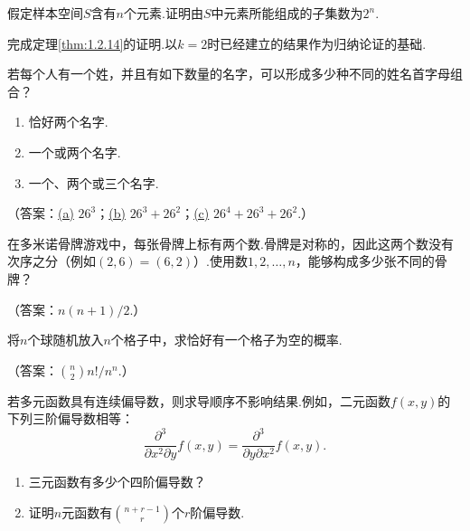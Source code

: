 \begin{exercise}\label{exercise:1.14}
假定样本空间$S$含有$n$个元素.证明由$S$中元素所能组成的子集数为$2^n$.
\end{exercise}

\begin{exercise}\label{exercise:1.15}
完成定理\ref{thm:1.2.14}的证明.以$k=2$时已经建立的结果作为归纳论证的基础.
\end{exercise}

\begin{exercise}\label{exercise:1.16}
若每个人有一个姓，并且有如下数量的名字，可以形成多少种不同的姓名首字母组合？
\begin{enumerate}
\item[(a)]\label{itm:exercise:1.16:a} 恰好两个名字.
\item[(b)]\label{itm:exercise:1.16:b} 一个或两个名字.
\item[(c)]\label{itm:exercise:1.16:c} 一个、两个或三个名字.
\end{enumerate}
（答案：\hyperref[itm:exercise:1.16:a]{(a)} $26^3$；\hyperref[itm:exercise:1.16:b]{(b)} $26^3+26^2$；\hyperref[itm:exercise:1.16:c]{(c)} $26^4+26^3+26^2$.）
\end{exercise}



\begin{exercise}\label{exercise:1.17}
在多米诺骨牌游戏中，每张骨牌上标有两个数.骨牌是对称的，因此这两个数没有次序之分（例如$(2,6)=(6,2)$）.使用数$1,2,\ldots,n$，能够构成多少张不同的骨牌？

（答案：$n(n+1)/2$.）
\end{exercise}

\begin{exercise}\label{exercise:1.18}
将$n$个球随机放入$n$个格子中，求恰好有一个格子为空的概率.

（答案：$\binom n2 n!/n^n$.）
\end{exercise}

\begin{exercise}\label{exercise:1.19}
若多元函数具有连续偏导数，则求导顺序不影响结果.例如，二元函数$f(x,y)$的下列三阶偏导数相等：
$$
\frac{\partial^3}{\partial x^2\partial y}f(x,y)
=\frac{\partial^3}{\partial y\partial x^2}f(x,y).
$$
\begin{enumerate}
\item[(a)] 三元函数有多少个四阶偏导数？
\item[(b)] 证明$n$元函数有$\binom{n+r-1}{r}$个$r$阶偏导数.
\end{enumerate}
\end{exercise}

